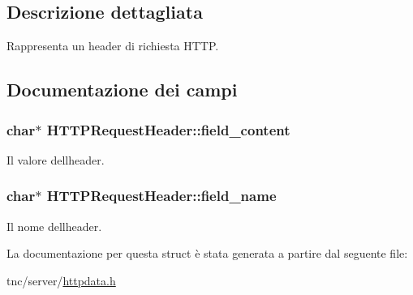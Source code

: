 \subsection{Descrizione dettagliata}
Rappresenta un header di richiesta H\+T\+T\+P. 



\subsection{Documentazione dei campi}
\hypertarget{structHTTPRequestHeader_a89cbb9f9651b0866bc4f0dbd37b5e435}{}
\subsubsection[{field\+\_\+content}]{\setlength{\rightskip}{0pt plus 5cm}char$\ast$ H\+T\+T\+P\+Request\+Header\+::field\+\_\+content}\label{structHTTPRequestHeader_a89cbb9f9651b0866bc4f0dbd37b5e435}


Il valore dell\textquotesingle{}header. 

\hypertarget{structHTTPRequestHeader_a9455709e6aff8eb48c42866a1a674094}{}
\subsubsection[{field\+\_\+name}]{\setlength{\rightskip}{0pt plus 5cm}char$\ast$ H\+T\+T\+P\+Request\+Header\+::field\+\_\+name}\label{structHTTPRequestHeader_a9455709e6aff8eb48c42866a1a674094}


Il nome dell\textquotesingle{}header. 



La documentazione per questa struct è stata generata a partire dal seguente file\+:\begin{DoxyCompactItemize}
\item 
tnc/server/\hyperlink{httpdata_8h}{httpdata.\+h}\end{DoxyCompactItemize}
